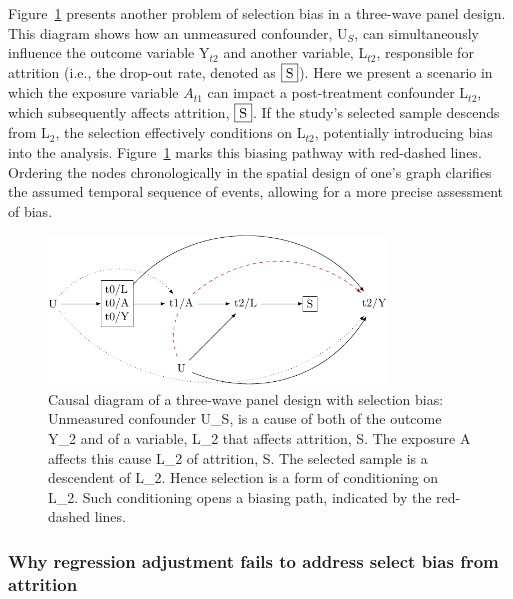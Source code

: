 \documentclass[
  singlecolumn]{article}
\begin{document}
Figure~\ref{fig-dag-8-2} presents another problem of selection bias in a
three-wave panel design. This diagram shows how an unmeasured
confounder, U\(_S\), can simultaneously influence the outcome variable
Y\(_{t2}\) and another variable, L\(_{t2}\), responsible for attrition
(i.e., the drop-out rate, denoted as \(\framebox{S}\)). Here we present
a scenario in which the exposure variable \(A_{t1}\) can impact a
post-treatment confounder L\(_{t2}\), which subsequently affects
attrition, \(\framebox{S}\). If the study's selected sample descends
from L\(_2\), the selection effectively conditions on L\(_{t2}\),
potentially introducing bias into the analysis. Figure~\ref{fig-dag-8-2}
marks this biasing pathway with red-dashed lines. Ordering the nodes
chronologically in the spatial design of one's graph clarifies the
assumed temporal sequence of events, allowing for a more precise
assessment of bias.

\begin{figure}

{\centering \includegraphics[width=0.8\textwidth,height=\textheight]{causal-dags_files/figure-pdf/fig-dag-8-2-1.pdf}

}

\caption{\label{fig-dag-8-2}Causal diagram of a three-wave panel design
with selection bias: Unmeasured confounder U\_S, is a cause of both of
the outcome Y\_2 and of a variable, L\_2 that affects attrition, S. The
exposure A affects this cause L\_2 of attrition, S. The selected sample
is a descendent of L\_2. Hence selection is a form of conditioning on
L\_2. Such conditioning opens a biasing path, indicated by the
red-dashed lines.}

\end{figure}

\hypertarget{why-regression-adjustment-fails-to-address-select-bias-from-attrition}{%
\subsubsection{Why regression adjustment fails to address select bias
from
attrition}\label{why-regression-adjustment-fails-to-address-select-bias-from-attrition}}
\end{document}
